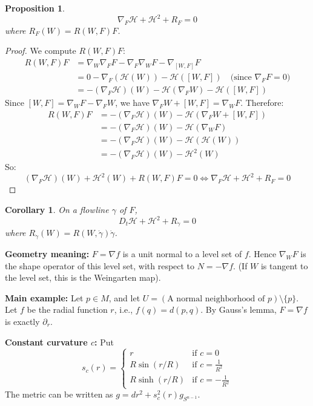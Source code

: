 \documentclass[11pt, a4paper]{article}
\theoremstyle{plain}
\newtheorem{proposition}[theorem]{Proposition}
\newtheorem{corollary}[theorem]{Corollary}
\theoremstyle{definition}
\theoremstyle{remark}
\begin{document}
{\begin{proposition}
\[ \nabla_F \mathcal{H} + \mathcal{H}^2 + R_F = 0 \]
where $R_F(W) = R(W, F)F$.
\end{proposition}

\begin{proof}
We compute $R(W, F)F$:
\begin{align*}
R(W, F)F &= \nabla_W \nabla_F F - \nabla_F \nabla_W F - \nabla_{[W, F]} F \\
&= 0 - \nabla_F(\mathcal{H}(W)) - \mathcal{H}([W, F]) \quad \text{(since $\nabla_F F = 0$)} \\
&= -(\nabla_F \mathcal{H})(W) - \mathcal{H}(\nabla_F W) - \mathcal{H}([W, F])
\end{align*}
Since $[W, F] = \nabla_W F - \nabla_F W$, we have $\nabla_F W + [W, F] = \nabla_W F$. Therefore:
\begin{align*}
R(W, F)F &= -(\nabla_F \mathcal{H})(W) - \mathcal{H}(\nabla_F W + [W, F]) \\
&= -(\nabla_F \mathcal{H})(W) - \mathcal{H}(\nabla_W F) \\
&= -(\nabla_F \mathcal{H})(W) - \mathcal{H}(\mathcal{H}(W)) \\
&= -(\nabla_F \mathcal{H})(W) - \mathcal{H}^2(W)
\end{align*}
So:
\[ (\nabla_F \mathcal{H})(W) + \mathcal{H}^2(W) + R(W, F)F = 0 \iff \nabla_F \mathcal{H} + \mathcal{H}^2 + R_F = 0 \]
\end{proof}

\begin{corollary}
On a flowline $\gamma$ of $F$,
\[ D_t \mathcal{H} + \mathcal{H}^2 + R_{\dot{\gamma}} = 0 \]
where $R_{\dot{\gamma}}(W) = R(W, \dot{\gamma})\dot{\gamma}$.
\end{corollary}

\textbf{Geometry meaning:} $F = \nabla f$ is a unit normal to a level set of $f$. Hence $\nabla_W F$ is the shape operator of this level set, with respect to $N = -\nabla f$. (If $W$ is tangent to the level set, this is the Weingarten map).

\textbf{Main example:} Let $p \in M$, and let $U = (\text{A normal neighborhood of } p) \setminus \{p\}$. Let $f$ be the radial function $r$, i.e., $f(q) = d(p, q)$. By Gauss's lemma, $F = \nabla f$ is exactly $\partial_r$.

\textbf{Constant curvature $c$:}
Put
\[ s_c(r) = 
\begin{cases} 
r & \text{if } c=0 \\ 
R \sin(r/R) & \text{if } c = \frac{1}{R^2} \\ 
R \sinh(r/R) & \text{if } c = -\frac{1}{R^2} 
\end{cases}
\]
The metric can be written as $g = dr^2 + s_c^2(r) g_{S^{n-1}}$.

}
\end{document}
